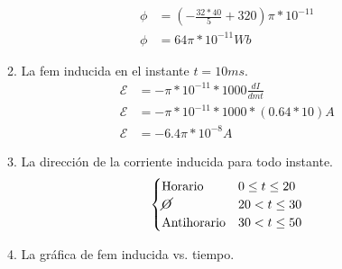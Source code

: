 \documentclass[10pt, twoside]{article}
\begin{document}
\begin{enumerate}
\begin{enumerate}
\begin{align*}
					\phi &= ( -\frac{32*40}{5}+320 )\pi*10^{-11}\\
					\phi &= 64\pi*10^{-11} Wb
				\end{align*}
			\item La fem inducida en el instante $t=10ms$.
				\begin{align*}
					\mathcal{E} &= -\pi*10^{-11} * 1000\frac{dI}{dmt}\\
					\mathcal{E} &= -\pi*10^{-11} * 1000*(0.64*10)A\\
					\mathcal{E} &= - 6.4\pi*10^{-8}A
				\end{align*}
			\item La dirección de la corriente inducida para todo instante.
				\begin{align*}
					\begin{cases}
						\text{Horario}     & 0 \leq t \leq 20\\
						\cancel{O}         & 20 < t \leq 30\\
						\text{Antihorario} & 30 < t \leq 50
					\end{cases}
				\end{align*}
			\item La gráfica de fem inducida vs. tiempo.
		\end{enumerate}
\end{enumerate}
\end{document}

